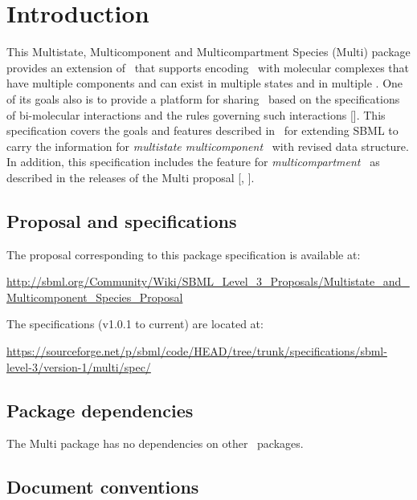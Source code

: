 
\section{Introduction}
\label{def:Introduction}

This Multistate, Multicomponent and Multicompartment Species (Multi) package provides an extension of \SbmlLevelThreeWC\ that supports encoding \smodels\ with molecular complexes that have multiple components and can exist in multiple states and in multiple \compartments. One of its goals also is to provide a platform for sharing \smodels\ based on the specifications of bi-molecular interactions and the rules governing such interactions [\cite{ref:simmune2012, ref:scienceSignaling2006, ref:FeretPnas2009, ref:modeler2013}]. This specification covers the goals and features described in \multiOneProposalWC\ for extending SBML to carry the information for \textit{multistate multicomponent} \species\ with revised data structure. In addition, this specification includes the feature for \textit{multicompartment} \species\ as described in the releases of the Multi proposal [\cite{ref:multiproposal280}, \cite{ref:revisedMulti}].

\subsection{Proposal and specifications}
\label{def:Proposal}

The proposal corresponding to this package specification is available at:

\hspace{3ex}\url{http://sbml.org/Community/Wiki/SBML_Level_3_Proposals/Multistate_and_Multicomponent_Species_Proposal}

The specifications (v1.0.1 to current) are located at:

\hspace{3ex}\url{https://sourceforge.net/p/sbml/code/HEAD/tree/trunk/specifications/sbml-level-3/version-1/multi/spec/}

\subsection{Package dependencies}
\label{def:Package_dependencies}

The Multi package has no dependencies on other \SbmlLevelThree\ packages.

\subsection{Document conventions}
\label{def:Document_conventions}

